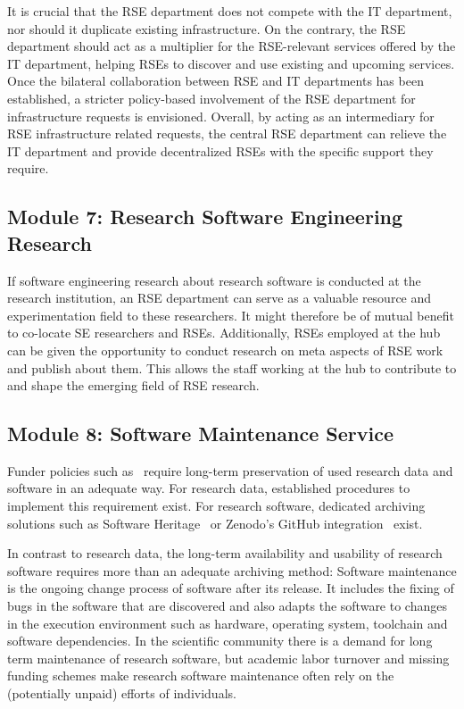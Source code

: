 \documentclass[a4paper]{article}
\begin{document}
It is crucial that the RSE department does not compete with the IT department, nor should it duplicate existing infrastructure.
On the contrary, the RSE department should act as a multiplier for the RSE-relevant services offered by the IT department, helping RSEs to discover and use existing and upcoming services.
Once the bilateral collaboration between RSE and IT departments has been established, a stricter policy-based involvement of the RSE department for infrastructure requests is envisioned.
Overall, by acting as an intermediary for RSE infrastructure related requests, the central RSE department can relieve the IT department and provide decentralized RSEs with the specific support they require.

\subsection{Module 7: Research Software Engineering Research}
\label{sec:rseresearch}

If software engineering research about research software is conducted at the research institution, an RSE department can serve as a valuable resource and experimentation field to these researchers.
It might therefore be of mutual benefit to co-locate SE researchers and RSEs.
Additionally, RSEs employed at the hub can be given the opportunity to conduct research on meta aspects of RSE work and publish about them.
This allows the staff working at the hub to contribute to and shape the emerging field of RSE research.

\subsection{Module 8: Software Maintenance Service}
\label{sec:maintenance}

Funder policies such as~\autocite{dfg_gsp} require long-term preservation of used research data and software in an adequate way.
For research data, established procedures to implement this requirement exist.
For research software, dedicated archiving solutions such as Software Heritage~\autocite{DiCosmo2020,DiCosmo2023} or Zenodo's GitHub integration~\autocite{GitHubZenodo} exist.

In contrast to research data, the long-term availability and usability of research software requires more than an adequate archiving method:
Software maintenance is the ongoing change process of software after its release.
It includes the fixing of bugs in the software that are discovered and also adapts the software to changes in the execution environment such as hardware, operating system, toolchain and software dependencies.
In the scientific community there is a demand for long term maintenance of research software,
but academic labor turnover and missing funding schemes make research software maintenance often rely on the (potentially unpaid) efforts of individuals.
\end{document}
